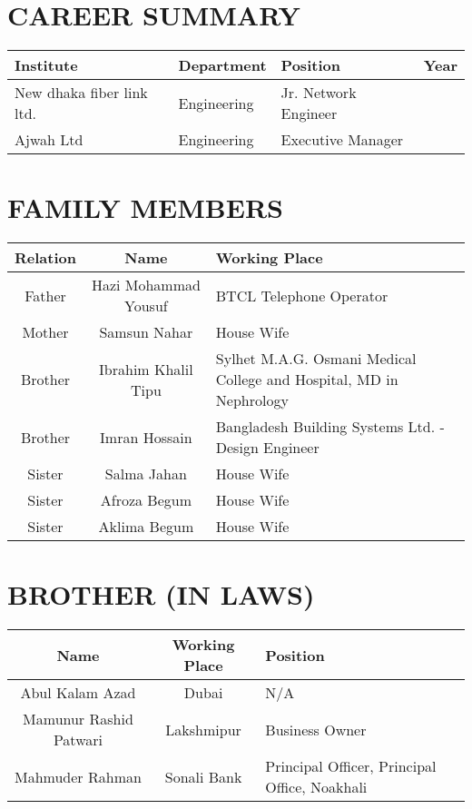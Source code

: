 \documentclass{article}
\begin{document}
\vspace{1cm} %

\section*{CAREER SUMMARY}
\begin{tabular}{|>{\centering\arraybackslash}m{3cm}|>{\centering\arraybackslash}m{3cm}|>{\centering\arraybackslash}m{3cm}|>{\centering\arraybackslash}m{3cm}|}
    \hline
    \textbf{Institute} & \textbf{Department} & \textbf{Position} & \textbf{Year} \\
    \hline
    New dhaka fiber link ltd. & Engineering & Jr. Network Engineer & 2021 \\
    \hline
    Ajwah Ltd & Engineering & Executive Manager & 2022 \\
    \hline
\end{tabular}


\section*{FAMILY MEMBERS}
{\small
\begin{tabular}{|c|c|>{\centering\arraybackslash}m{8cm}|}
    \hline
    \textbf{Relation} & \textbf{Name} & \textbf{Working Place} \\
    \hline
    Father & Hazi Mohammad Yousuf & BTCL Telephone Operator \\
    \hline
    Mother & Samsun Nahar & House Wife \\
    \hline
    Brother & Ibrahim Khalil Tipu & Sylhet M.A.G. Osmani Medical College and Hospital, MD in Nephrology \\
    \hline
    Brother & Imran Hossain & Bangladesh Building Systems Ltd. - Design Engineer \\
    \hline
    Sister & Salma Jahan & House Wife \\
    \hline
    Sister & Afroza Begum & House Wife \\
    \hline
    Sister & Aklima Begum & House Wife \\
    \hline
\end{tabular}
}

\vspace{1cm} %

\section*{BROTHER (IN LAWS)}
\begin{tabular}{|c|c|>{\centering\arraybackslash}m{6.25cm}|}
    \hline
    \textbf{Name} & \textbf{Working Place} & \textbf{Position} \\
    \hline
    Abul Kalam Azad & Dubai & N/A \\
    \hline
    Mamunur Rashid Patwari & Lakshmipur & Business Owner \\
    \hline
    Mahmuder Rahman & Sonali Bank & Principal Officer, Principal Office, Noakhali \\
    \hline
\end{tabular}
\end{document}
